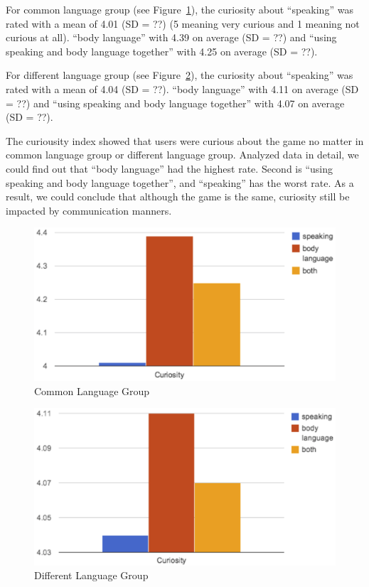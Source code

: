 For common language group (see Figure~\ref{fig:US_Curi_Com}), the curiosity about ``speaking'' was rated with a mean of 4.01 (SD = ??) (5 meaning very curious and 1 meaning not curious at all). ``body language'' with 4.39 on average (SD = ??) and ``using speaking and body language together'' with 4.25 on average (SD = ??).

For different language group (see Figure~\ref{fig:US_Curi_Dif}), the curiosity about ``speaking'' was rated with a mean of 4.04 (SD = ??). ``body language'' with 4.11 on average (SD = ??) and ``using speaking and body language together'' with 4.07 on average (SD = ??).

The curiousity index showed that users were curious about the game no matter in common language group or different language group. Analyzed data in detail, we could find out that ``body language'' had the highest rate. Second is ``using speaking and body language together'', and ``speaking'' has the worst rate. As a result, we could conclude that although the game is the same, curiosity still be impacted by communication manners.

\begin{figure}[!h]
\centering
\includegraphics[width=0.9\columnwidth]{Figures/US_Curi_Com.png}
\caption{Common Language Group}
\label{fig:US_Curi_Com}
\end{figure}

\begin{figure}[!h]
\centering
\includegraphics[width=0.9\columnwidth]{Figures/US_Curi_Dif.png}
\caption{Different Language Group}
\label{fig:US_Curi_Dif}
\end{figure}


